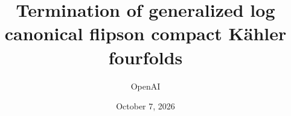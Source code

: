 \documentclass[11pt]{amsart}
\title[Generalized log canonical flips on K\"ahler fourfolds]{Termination of generalized log canonical flips\newline on compact K\"ahler fourfolds}
\author{OpenAI}
\date{October 7, 2026}
\theoremstyle{definition}
\theoremstyle{remark}
\numberwithin{equation}{section}
\begin{document}
\begin{abstract}

\end{abstract}
\maketitle
\tableofcontents










\end{document}
